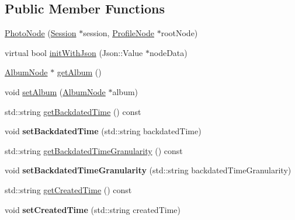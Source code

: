 \subsection*{Public Member Functions}
\begin{DoxyCompactItemize}
\item 
\hyperlink{classfl4cpp_1_1_photo_node_a62cbf8438e1fdb2ed72263f59ec34f2f}{Photo\+Node} (\hyperlink{classfl4cpp_1_1_session}{Session} $\ast$session, \hyperlink{classfl4cpp_1_1_profile_node}{Profile\+Node} $\ast$root\+Node)
\item 
virtual bool \hyperlink{classfl4cpp_1_1_photo_node_a02098c1a11f5596007793f13228a4054}{init\+With\+Json} (Json\+::\+Value $\ast$node\+Data)
\item 
\hyperlink{classfl4cpp_1_1_album_node}{Album\+Node} $\ast$ \hyperlink{classfl4cpp_1_1_photo_node_ae6ec3d27b19eaf04fcf57d03952466ef}{get\+Album} ()
\item 
void \hyperlink{classfl4cpp_1_1_photo_node_a9f3abc8fb2aa7bf48ec357b35fd20bf2}{set\+Album} (\hyperlink{classfl4cpp_1_1_album_node}{Album\+Node} $\ast$album)
\item 
std\+::string \hyperlink{classfl4cpp_1_1_photo_node_a754807f8f23b87137588c717ade32d7e}{get\+Backdated\+Time} () const 
\item 
void {\bfseries set\+Backdated\+Time} (std\+::string backdated\+Time)\hypertarget{classfl4cpp_1_1_photo_node_a847ba863675eaf3921a827247ba112d7}{}\label{classfl4cpp_1_1_photo_node_a847ba863675eaf3921a827247ba112d7}

\item 
std\+::string \hyperlink{classfl4cpp_1_1_photo_node_add239f9a28a2a957d8d5f02082c9208d}{get\+Backdated\+Time\+Granularity} () const 
\item 
void {\bfseries set\+Backdated\+Time\+Granularity} (std\+::string backdated\+Time\+Granularity)\hypertarget{classfl4cpp_1_1_photo_node_a1172f27a0fe3f3791dd5cabcdcb4ea65}{}\label{classfl4cpp_1_1_photo_node_a1172f27a0fe3f3791dd5cabcdcb4ea65}

\item 
std\+::string \hyperlink{classfl4cpp_1_1_photo_node_a1dd40ba5593e7663b0969edad52e15ab}{get\+Created\+Time} () const 
\item 
void {\bfseries set\+Created\+Time} (std\+::string created\+Time)\hypertarget{classfl4cpp_1_1_photo_node_a089bccd764af96fc93bdc8f4961ca3d7}{}\label{classfl4cpp_1_1_photo_node_a089bccd764af96fc93bdc8f4961ca3d7}


\end{DoxyCompactItemize}
